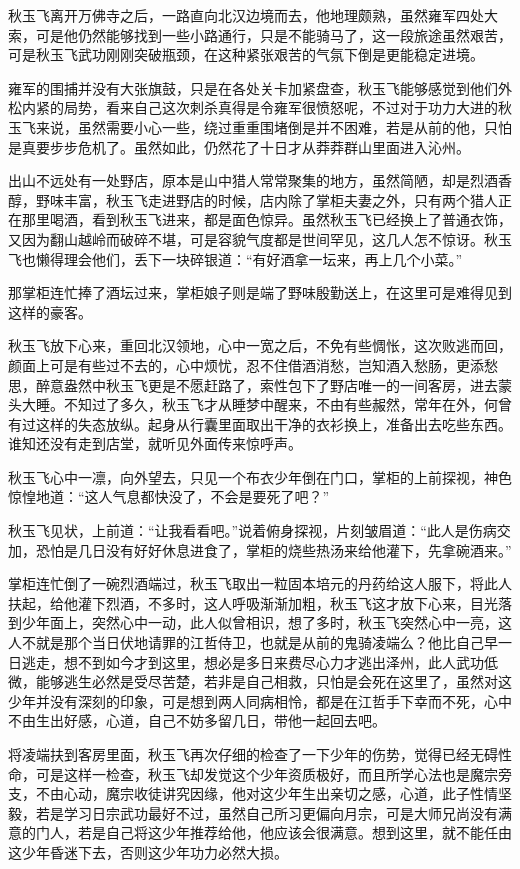 秋玉飞离开万佛寺之后，一路直向北汉边境而去，他地理颇熟，虽然雍军四处大索，可是他仍然能够找到一些小路通行，只是不能骑马了，这一段旅途虽然艰苦，可是秋玉飞武功刚刚突破瓶颈，在这种紧张艰苦的气氛下倒是更能稳定进境。

雍军的围捕并没有大张旗鼓，只是在各处关卡加紧盘查，秋玉飞能够感觉到他们外松内紧的局势，看来自己这次刺杀真得是令雍军很愤怒呢，不过对于功力大进的秋玉飞来说，虽然需要小心一些，绕过重重围堵倒是并不困难，若是从前的他，只怕是真要步步危机了。虽然如此，仍然花了十日才从莽莽群山里面进入沁州。

出山不远处有一处野店，原本是山中猎人常常聚集的地方，虽然简陋，却是烈酒香醇，野味丰富，秋玉飞走进野店的时候，店内除了掌柜夫妻之外，只有两个猎人正在那里喝酒，看到秋玉飞进来，都是面色惊异。虽然秋玉飞已经换上了普通衣饰，又因为翻山越岭而破碎不堪，可是容貌气度都是世间罕见，这几人怎不惊讶。秋玉飞也懒得理会他们，丢下一块碎银道：“有好酒拿一坛来，再上几个小菜。”

那掌柜连忙捧了酒坛过来，掌柜娘子则是端了野味殷勤送上，在这里可是难得见到这样的豪客。

秋玉飞放下心来，重回北汉领地，心中一宽之后，不免有些惆怅，这次败逃而回，颜面上可是有些过不去的，心中烦忧，忍不住借酒消愁，岂知酒入愁肠，更添愁思，醉意盎然中秋玉飞更是不愿赶路了，索性包下了野店唯一的一间客房，进去蒙头大睡。不知过了多久，秋玉飞才从睡梦中醒来，不由有些赧然，常年在外，何曾有过这样的失态放纵。起身从行囊里面取出干净的衣衫换上，准备出去吃些东西。谁知还没有走到店堂，就听见外面传来惊呼声。

秋玉飞心中一凛，向外望去，只见一个布衣少年倒在门口，掌柜的上前探视，神色惊惶地道：“这人气息都快没了，不会是要死了吧？”

秋玉飞见状，上前道：“让我看看吧。”说着俯身探视，片刻皱眉道：“此人是伤病交加，恐怕是几日没有好好休息进食了，掌柜的烧些热汤来给他灌下，先拿碗酒来。”

掌柜连忙倒了一碗烈酒端过，秋玉飞取出一粒固本培元的丹药给这人服下，将此人扶起，给他灌下烈酒，不多时，这人呼吸渐渐加粗，秋玉飞这才放下心来，目光落到少年面上，突然心中一动，此人似曾相识，想了多时，秋玉飞突然心中一亮，这人不就是那个当日伏地请罪的江哲侍卫，也就是从前的鬼骑凌端么？他比自己早一日逃走，想不到如今才到这里，想必是多日来费尽心力才逃出泽州，此人武功低微，能够逃生必然是受尽苦楚，若非是自己相救，只怕是会死在这里了，虽然对这少年并没有深刻的印象，可是想到两人同病相怜，都是在江哲手下幸而不死，心中不由生出好感，心道，自己不妨多留几日，带他一起回去吧。

将凌端扶到客房里面，秋玉飞再次仔细的检查了一下少年的伤势，觉得已经无碍性命，可是这样一检查，秋玉飞却发觉这个少年资质极好，而且所学心法也是魔宗旁支，不由心动，魔宗收徒讲究因缘，他对这少年生出亲切之感，心道，此子性情坚毅，若是学习日宗武功最好不过，虽然自己所习更偏向月宗，可是大师兄尚没有满意的门人，若是自己将这少年推荐给他，他应该会很满意。想到这里，就不能任由这少年昏迷下去，否则这少年功力必然大损。

